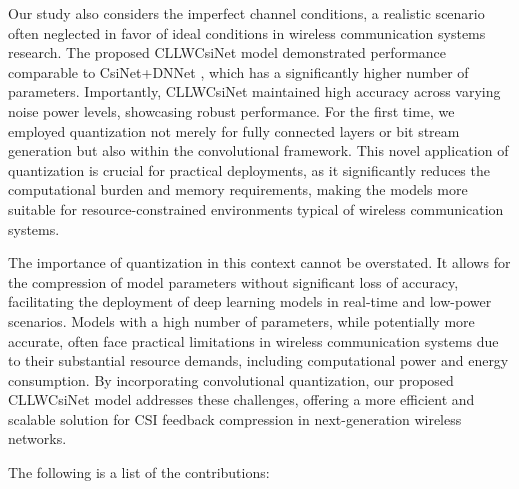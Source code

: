 \documentclass[lettersize,journal]{IEEEtran}
\begin{document}
Our study also considers the imperfect channel conditions, a realistic scenario often neglected in favor of ideal conditions in wireless communication systems research. The proposed CLLWCsiNet model demonstrated performance comparable to CsiNet+DNNet \cite{abw}, which has a significantly higher number of parameters. Importantly, CLLWCsiNet maintained high accuracy across varying noise power levels, showcasing robust performance. For the first time, we employed quantization not merely for fully connected layers or bit stream generation but also within the convolutional framework. This novel application of quantization is crucial for practical deployments, as it significantly reduces the computational burden and memory requirements, making the models more suitable for resource-constrained environments typical of wireless communication systems.

The importance of quantization in this context cannot be overstated. It allows for the compression of model parameters without significant loss of accuracy, facilitating the deployment of deep learning models in real-time and low-power scenarios. Models with a high number of parameters, while potentially more accurate, often face practical limitations in wireless communication systems due to their substantial resource demands, including computational power and energy consumption. By incorporating convolutional quantization, our proposed CLLWCsiNet model addresses these challenges, offering a more efficient and scalable solution for CSI feedback compression in next-generation wireless networks.

The following is a list of the contributions:
\end{document}
